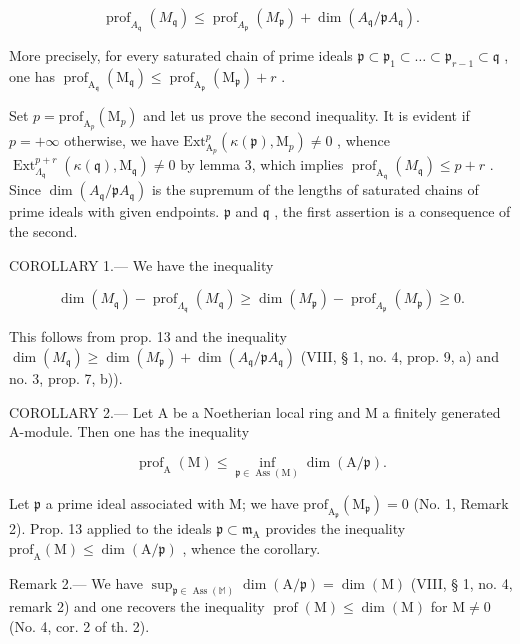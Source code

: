 \[
\operatorname{prof} _ {A _ {\mathfrak {q}}} (M _ {\mathfrak {q}}) \leqslant \operatorname{prof} _ {A _ {\mathfrak {p}}} (M _ {\mathfrak {p}}) + \dim (A _ {\mathfrak {q}} / \mathfrak {p} A _ {\mathfrak {q}}).
\]

More precisely, for every saturated chain of prime ideals \(\mathfrak{p} \subset \mathfrak{p}_1 \subset \ldots \subset \mathfrak{p}_{r-1} \subset \mathfrak{q}\) , one has \(\operatorname{prof}_{\mathrm{A}_{\mathfrak{q}}}(\mathrm{M}_{\mathfrak{q}}) \leqslant \operatorname{prof}_{\mathrm{A}_{\mathfrak{p}}}(\mathrm{M}_{\mathfrak{p}}) + r\) .

Set \(p = \text{prof}_{\text{A}_p}(\text{M}_p)\) and let us prove the second inequality. It is evident if \(p = +\infty\) otherwise, we have \(\text{Ext}_{\text{A}_p}^p(\kappa(\mathfrak{p}), \text{M}_p) \neq 0\) , whence \(\operatorname{Ext}_{\Lambda_{\mathfrak{q}}}^{p+r}(\kappa(\mathfrak{q}),\mathrm{M}_{\mathfrak{q}})\neq0\) by lemma 3, which implies \(\operatorname{prof}_{\mathrm{A}_{\mathfrak{q}}}(M_{\mathfrak{q}})\leqslant p+r\) . Since \(\dim(A_{\mathfrak{q}}/\mathfrak{p}A_{\mathfrak{q}})\) is the supremum of the lengths of saturated chains of prime ideals with given endpoints. \(\mathfrak{p}\) and \(\mathfrak{q}\) , the first assertion is a consequence of the second.

COROLLARY 1.--- We have the inequality

\[
\dim (M _ {\mathfrak {q}}) - \operatorname{prof} _ {\Lambda_ {\mathfrak {q}}} (M _ {\mathfrak {q}}) \geqslant \dim (M _ {\mathfrak {p}}) - \operatorname{prof} _ {A _ {\mathfrak {p}}} (M _ {\mathfrak {p}}) \geqslant 0.
\]

This follows from prop. 13 and the inequality \(\dim(M_{\mathfrak{q}}) \geqslant \dim(M_{\mathfrak{p}}) + \dim(A_{\mathfrak{q}} / \mathfrak{p}A_{\mathfrak{q}})\) (VIII, § 1, no. 4, prop. 9, a) and no. 3, prop. 7, b)).

COROLLARY 2.--- Let A be a Noetherian local ring and M a finitely generated A-module. Then one has the inequality

\[
\operatorname{prof} _ {\mathrm{A}} (\mathrm{M}) \leqslant \inf _ {\mathfrak {p} \in \operatorname{Ass} (\mathrm{M})} \dim (\mathrm{A} / \mathfrak {p}).
\]

Let \(\mathfrak{p}\) a prime ideal associated with M; we have \(\mathrm{prof}_{\mathrm{A}_{\mathfrak{p}}}(\mathrm{M}_{\mathfrak{p}})=0\) (No. 1, Remark 2). Prop. 13 applied to the ideals \(\mathfrak{p}\subset\mathfrak{m}_{\mathrm{A}}\) provides the inequality \(\mathrm{prof}_{\mathrm{A}}(\mathrm{M})\leqslant\dim(\mathrm{A}/\mathfrak{p})\) , whence the corollary.

Remark 2.--- We have \(\sup_{\mathfrak{p}\in\operatorname{Ass}(\mathbb{M})}\dim(\mathrm{A}/\mathfrak{p})=\dim(\mathrm{M})\) (VIII, § 1, no. 4, remark 2) and one recovers the inequality \(\operatorname{prof}(\mathrm{M})\leqslant\dim(\mathrm{M})\) for \(\mathrm{M}\neq0\) (No. 4, cor. 2 of th. 2).

